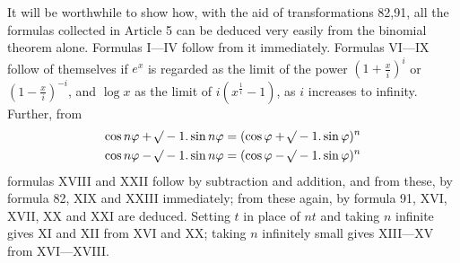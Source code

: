 
It will be worthwhile to show how, with the aid of transformations 82,91, all the formulas collected in Article 5 can be deduced very easily from the binomial theorem alone. Formulas I---IV follow from it immediately. Formulas VI---IX follow of themselves if \(e^x\) is regarded as the limit of the power \(\left(1+\frac{x}{i}\right)^i\) or \(\left(1-\frac{x}{i}\right)^{-i}\), and \(\log x\) as the limit of \(i(x^{\frac{1}{i}}-1)\), as \(i\) increases to infinity. Further, from
\[
\begin{aligned}[c]
\cos n\varphi+\mathord{{}^{}\!\surd}-1.\sin n\varphi&=(\cos\varphi+\mathord{{}^{}\!\surd}-1.\sin\varphi)^n\\
\cos n\varphi-\mathord{{}^{}\!\surd}-1.\sin n\varphi&=(\cos\varphi-\mathord{{}^{}\!\surd}-1.\sin\varphi)^n
\end{aligned}
\]
formulas XVIII and XXII follow by subtraction and addition, and from these, by formula 82, XIX and XXIII immediately; from these again, by formula 91, XVI, XVII, XX and XXI are deduced. Setting \(t\) in place of \(nt\) and taking \(n\) infinite gives XI and XII from XVI and XX; taking \(n\) infinitely small gives XIII---XV from XVI---XVIII.



